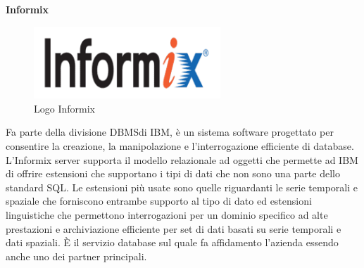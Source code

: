 \textbf{Informix}

\begin{figure}[H]
	\includegraphics[width=7cm]{immagini/Informix.png}
	\centering
	\caption{Logo Informix}
\end{figure}

Fa parte della divisione DBMS\glosp di IBM\glosp, è un sistema software progettato per consentire la creazione, la manipolazione e l'interrogazione efficiente di database.
L'Informix server supporta il modello relazionale ad oggetti che permette ad IBM di offrire estensioni che supportano i tipi di dati che non sono una parte dello standard SQL\glo.
Le estensioni più usate sono quelle riguardanti le serie temporali e spaziale che forniscono entrambe supporto al tipo di dato ed estensioni linguistiche che permettono 
interrogazioni per un dominio specifico ad alte prestazioni e archiviazione efficiente per set di dati basati su serie temporali e dati spaziali.
È il servizio database sul quale fa affidamento l'azienda essendo anche uno dei partner principali.